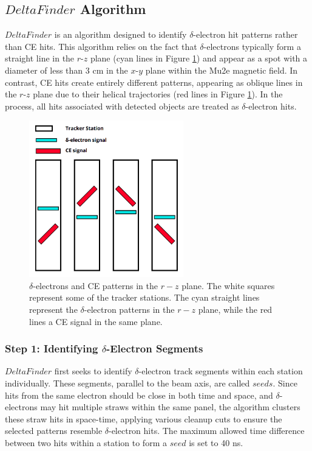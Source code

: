\subsection{$DeltaFinder$ Algorithm}\label{deltafinder}

$DeltaFinder$ is an algorithm designed to identify $\delta$-electron 
hit patterns rather than CE hits. This algorithm relies on the 
fact that $\delta$-electrons typically form a straight line in 
the $r$-$z$ plane (cyan lines in Figure \ref{fig:yzviewdelta}) 
and appear as a spot with a diameter of less than 3 cm in the 
$x$-$y$ plane within the Mu2e magnetic field. In contrast, 
CE hits create entirely different patterns, appearing as oblique lines in 
the $r$-$z$ plane due to their helical trajectories (red lines in Figure \ref{fig:yzviewdelta}). 
In the process, all hits associated with detected objects are treated as $\delta$-electron hits.
\begin{figure}[!h]
    \centering
    \includegraphics[width =0.6\textwidth]{figures/png/Screenshot_20240811_123048.png}
    \caption[$\delta$-electrons and CE patterns in $r-z$ plane.]{
        $\delta$-electrons and CE patterns in the $r-z$ plane. 
        The white squares represent some of the tracker stations. 
        The cyan straight lines represent the $\delta$-electron 
        patterns in the $r-z$ plane, while the red lines a CE signal in the same plane.
        }
    \label{fig:yzviewdelta}
\end{figure}
\subsubsection{Step 1: Identifying $\delta$-Electron Segments}
$DeltaFinder$ first seeks to identify $\delta$-electron track 
segments within each station individually. These segments, 
parallel to the beam axis, are called $seeds$. Since hits 
from the same electron should be close in both time and space, 
and $\delta$-electrons may hit multiple straws within the 
same panel, the algorithm clusters these straw hits in 
space-time, applying various cleanup cuts to ensure the 
selected patterns resemble $\delta$-electron hits. 
The maximum allowed time difference between two hits within 
a station to form a $seed$ is set to 40 ns.

